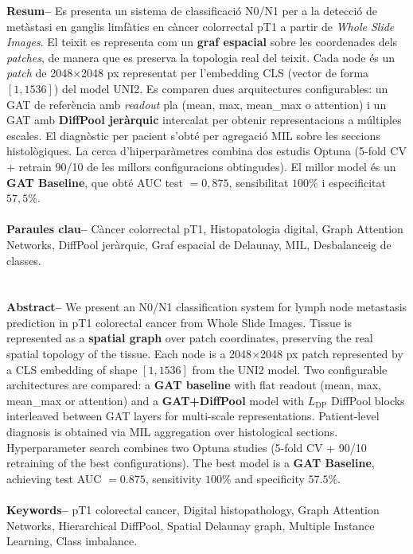 \documentclass[10pt,a4paper,twocolumn,twoside]{article}
\begin{document}
\begin{@twocolumnfalse}
\begin{center}
\parbox{0.915\textwidth}
{\sffamily
\textbf{Resum--}
Es presenta un sistema de classificació N0/N1 per a la detecció de metàstasi en ganglis limfàtics
en càncer colorrectal pT1 a partir de \textit{Whole Slide Images}. El teixit es representa com un
\textbf{graf espacial} sobre les coordenades dels \textit{patches},
de manera que es preserva la topologia real del teixit.
Cada node és un \textit{patch} de 2048$\times$2048 px representat per l'embedding
CLS (vector de forma $[1, 1536]$) del model UNI2. Es comparen dues arquitectures configurables: un GAT de referència
amb \textit{readout} pla (mean, max, mean\_max o attention) i un GAT amb \textbf{DiffPool jeràrquic}
intercalat per obtenir representacions a múltiples escales.
El diagnòstic per pacient s'obté per agregació MIL sobre les seccions histològiques.
La cerca d'hiperparàmetres combina dos estudis Optuna
(5-fold CV + retrain 90/10 de les millors configuracions obtingudes).
El millor model és un \textbf{GAT
Baseline}, que obté AUC test $=0{,}875$, sensibilitat $100\%$ i
especificitat $57{,}5\%$.
\\
\\
\textbf{Paraules clau-- } Càncer colorrectal pT1, Histopatologia digital, Graph Attention Networks,
DiffPool jeràrquic, Graf espacial de Delaunay, MIL, Desbalanceig de classes.\\
\\
\bigskip
\\
\textbf{Abstract--}
We present an N0/N1 classification system for lymph node metastasis prediction in pT1 colorectal
cancer from Whole Slide Images. Tissue is represented as a \textbf{spatial graph} over patch coordinates,
preserving the real spatial topology of the tissue.
Each node is a 2048$\times$2048 px patch represented by a
CLS embedding of shape $[1, 1536]$ from the UNI2 model. Two configurable architectures are compared: a
\textbf{GAT baseline} with flat readout (mean, max, mean\_max or attention) and a \textbf{GAT+DiffPool} model
with $L_{\text{DP}}$ DiffPool blocks interleaved between GAT layers for
multi-scale representations. Patient-level diagnosis is obtained via MIL aggregation over
histological sections. Hyperparameter search combines two Optuna studies
(5-fold CV + 90/10 retraining of the best configurations).
The best model is a \textbf{GAT Baseline}, achieving test
AUC $=0.875$, sensitivity $100\%$ and specificity $57.5\%$.
\\
\\
\textbf{Keywords-- } pT1 colorectal cancer, Digital histopathology, Graph Attention Networks,
Hierarchical DiffPool, Spatial Delaunay graph, Multiple Instance Learning, Class imbalance.\\
}


\end{center}
\end{@twocolumnfalse}
\end{document}

